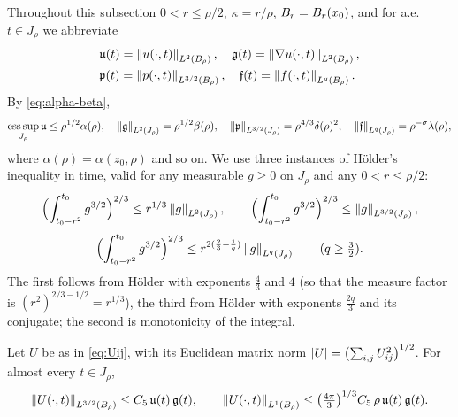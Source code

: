 \documentclass[11pt,reqno]{amsart}
\begin{document}
Throughout this subsection $0<r\le\rho/2$, $\kappa=r/\rho$, $B_{r}=B_{r}(x_{0})$,
and for a.e.\ $t\in J_{\rho}$ we abbreviate
\begin{equation}\label{eq:slice-norms}
\begin{aligned}
  &\mathfrak{u}(t)=\left\lVert u(\cdot,t) \right\rVert_{L^{2}(B_{\rho})},\quad
  \mathfrak{g}(t)=\left\lVert \nabla u(\cdot,t) \right\rVert_{L^{2}(B_{\rho})},\\
  &\mathfrak{p}(t)=\left\lVert p(\cdot,t) \right\rVert_{L^{3/2}(B_{\rho})},\quad
  \mathfrak{f}(t)=\left\lVert f(\cdot,t) \right\rVert_{L^{q}(B_{\rho})}.
\end{aligned}
\end{equation}
By \eqref{eq:alpha-beta},
\begin{equation}\label{eq:slice-norm-bounds}
  \operatorname*{ess\,sup}_{J_{\rho}}\mathfrak{u}\le\rho^{1/2}\alpha(\rho),
  \quad
  \left\lVert \mathfrak{g} \right\rVert_{L^{2}(J_{\rho})}=\rho^{1/2}\beta(\rho),
  \quad
  \left\lVert \mathfrak{p} \right\rVert_{L^{3/2}(J_{\rho})}=\rho^{4/3}\delta(\rho)^{2},
  \quad
  \left\lVert \mathfrak{f} \right\rVert_{L^{q}(J_{\rho})}=\rho^{-\sigma}\lambda(\rho),
\end{equation}
where $\alpha(\rho)=\alpha(z_{0},\rho)$ and so on. We use three instances of
H\"older's inequality in time, valid for any measurable $g\ge0$ on $J_{\rho}$
and any $0<r\le\rho/2$:
\begin{equation}\label{eq:time-holder}
  \Bigl(\int_{t_{0}-r^{2}}^{t_{0}}g^{3/2}\Bigr)^{2/3}
  \le r^{1/3}\left\lVert g \right\rVert_{L^{2}(J_{\rho})},
  \qquad
  \Bigl(\int_{t_{0}-r^{2}}^{t_{0}}g^{3/2}\Bigr)^{2/3}
  \le \left\lVert g \right\rVert_{L^{3/2}(J_{\rho})},
\end{equation}
\begin{equation}\label{eq:time-holder-q}
  \Bigl(\int_{t_{0}-r^{2}}^{t_{0}}g^{3/2}\Bigr)^{2/3}
  \le r^{2(\frac23-\frac1q)}\left\lVert g \right\rVert_{L^{q}(J_{\rho})}
  \qquad(q\ge\tfrac32).
\end{equation}
The first follows from H\"older with exponents $\tfrac43$ and $4$
(so that the measure factor is $(r^{2})^{2/3-1/2}=r^{1/3}$), the third from
H\"older with exponents $\tfrac{2q}{3}$ and its conjugate; the second is
monotonicity of the integral.

\begin{lemma}\label{lem:U-bounds}
Let $U$ be as in \eqref{eq:Uij}, with its Euclidean matrix norm
$\left\lvert U \right\rvert=\bigl(\sum_{i,j}U_{ij}^{2}\bigr)^{1/2}$. For almost every $t\in J_{\rho}$,
\begin{equation}\label{eq:U-bounds}
  \left\lVert U(\cdot,t) \right\rVert_{L^{3/2}(B_{\rho})}\le C_{5}\,\mathfrak{u}(t)\,\mathfrak{g}(t),
  \qquad
  \left\lVert U(\cdot,t) \right\rVert_{L^{1}(B_{\rho})}
    \le\bigl(\tfrac{4\pi}{3}\bigr)^{1/3}C_{5}\,\rho\,\mathfrak{u}(t)\,\mathfrak{g}(t).
\end{equation}
\end{lemma}
\end{document}
